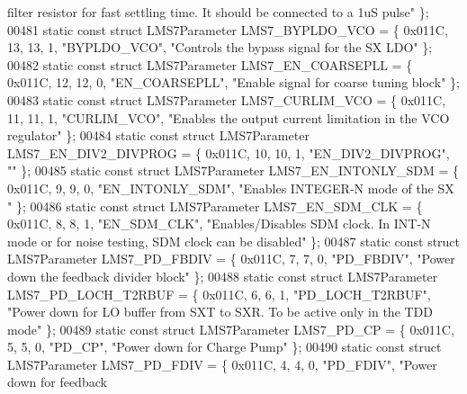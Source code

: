 \begin{DoxyCode}
{       filter resistor for fast settling time. It should be connected to a 1uS pulse"} \};
00481 \textcolor{keyword}{static} \textcolor{keyword}{const} \textcolor{keyword}{struct }LMS7Parameter LMS7_BYPLDO_VCO = \{ 0x011C, 13, 13, 1, \textcolor{stringliteral}{"BYPLDO\_VCO"}, \textcolor{stringliteral}{"Controls the bypass
       signal for the SX LDO"} \};
00482 \textcolor{keyword}{static} \textcolor{keyword}{const} \textcolor{keyword}{struct }LMS7Parameter LMS7_EN_COARSEPLL = \{ 0x011C, 12, 12, 0, \textcolor{stringliteral}{"EN\_COARSEPLL"}, \textcolor{stringliteral}{"Enable signal
       for coarse tuning block"} \};
00483 \textcolor{keyword}{static} \textcolor{keyword}{const} \textcolor{keyword}{struct }LMS7Parameter LMS7_CURLIM_VCO = \{ 0x011C, 11, 11, 1, \textcolor{stringliteral}{"CURLIM\_VCO"}, \textcolor{stringliteral}{"Enables the output
       current limitation in the VCO regulator"} \};
00484 \textcolor{keyword}{static} \textcolor{keyword}{const} \textcolor{keyword}{struct }LMS7Parameter LMS7_EN_DIV2_DIVPROG = \{ 0x011C, 10, 10, 1, \textcolor{stringliteral}{"EN\_DIV2\_DIVPROG"}, \textcolor{stringliteral}{""} \};
00485 \textcolor{keyword}{static} \textcolor{keyword}{const} \textcolor{keyword}{struct }LMS7Parameter LMS7_EN_INTONLY_SDM = \{ 0x011C, 9, 9, 0, \textcolor{stringliteral}{"EN\_INTONLY\_SDM"}, \textcolor{stringliteral}{"Enables
       INTEGER-N mode of the SX "} \};
00486 \textcolor{keyword}{static} \textcolor{keyword}{const} \textcolor{keyword}{struct }LMS7Parameter LMS7_EN_SDM_CLK = \{ 0x011C, 8, 8, 1, \textcolor{stringliteral}{"EN\_SDM\_CLK"}, \textcolor{stringliteral}{"Enables/Disables SDM
       clock. In INT-N mode or for noise testing, SDM clock can be disabled"} \};
00487 \textcolor{keyword}{static} \textcolor{keyword}{const} \textcolor{keyword}{struct }LMS7Parameter LMS7_PD_FBDIV = \{ 0x011C, 7, 7, 0, \textcolor{stringliteral}{"PD\_FBDIV"}, \textcolor{stringliteral}{"Power down the feedback
       divider block"} \};
00488 \textcolor{keyword}{static} \textcolor{keyword}{const} \textcolor{keyword}{struct }LMS7Parameter LMS7_PD_LOCH_T2RBUF = \{ 0x011C, 6, 6, 1, \textcolor{stringliteral}{"PD\_LOCH\_T2RBUF"}, \textcolor{stringliteral}{"Power down
       for LO buffer from SXT to SXR. To be active only in the TDD mode"} \};
00489 \textcolor{keyword}{static} \textcolor{keyword}{const} \textcolor{keyword}{struct }LMS7Parameter LMS7_PD_CP = \{ 0x011C, 5, 5, 0, \textcolor{stringliteral}{"PD\_CP"}, \textcolor{stringliteral}{"Power down for Charge Pump"} \};
00490 \textcolor{keyword}{static} \textcolor{keyword}{const} \textcolor{keyword}{struct }LMS7Parameter LMS7_PD_FDIV = \{ 0x011C, 4, 4, 0, \textcolor{stringliteral}{"PD\_FDIV"}, \textcolor{stringliteral}{"Power down for feedback
}
\end{DoxyCode}
